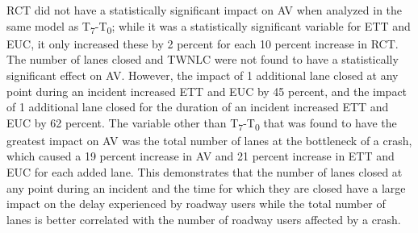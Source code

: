 \documentclass[
  letterpaper,
  authoryear]{elsarticle}
\begin{document}
RCT did not have a statistically significant impact on AV when analyzed
in the same model as T\textsubscript{7}-T\textsubscript{0}; while it was
a statistically significant variable for ETT and EUC, it only increased
these by 2 percent for each 10 percent increase in RCT. The number of
lanes closed and TWNLC were not found to have a statistically
significant effect on AV. However, the impact of 1 additional lane
closed at any point during an incident increased ETT and EUC by 45
percent, and the impact of 1 additional lane closed for the duration of
an incident increased ETT and EUC by 62 percent. The variable other than
T\textsubscript{7}-T\textsubscript{0} that was found to have the
greatest impact on AV was the total number of lanes at the bottleneck of
a crash, which caused a 19 percent increase in AV and 21 percent
increase in ETT and EUC for each added lane. This demonstrates that the
number of lanes closed at any point during an incident and the time for
which they are closed have a large impact on the delay experienced by
roadway users while the total number of lanes is better correlated with
the number of roadway users affected by a crash.
\end{document}
